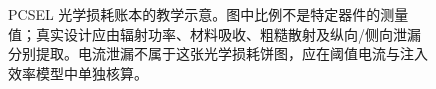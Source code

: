 \begin{figure}[htbp]
  \caption{PCSEL 光学损耗账本的教学示意。图中比例不是特定器件的测量值；真实设计应由辐射功率、材料吸收、粗糙散射及纵向/侧向泄漏分别提取。电流泄漏不属于这张光学损耗饼图，应在阈值电流与注入效率模型中单独核算。}
  \label{fig:ch07_loss_breakdown_piechart}
\end{figure}
